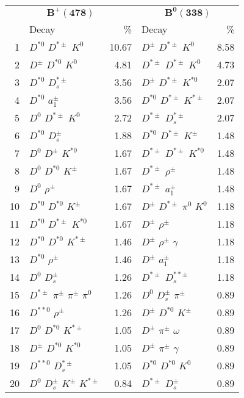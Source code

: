 \documentclass[6pt]{article}
\begin{document}
\begin{tabular}{rlr|lr}
\multicolumn{3}{c|}{$\boldsymbol{B^+(478)}$} & \multicolumn{2}{c}{$\boldsymbol{B^0(338)}$} \\
& Decay & \% & Decay & \% \\ \hline \hline
1 & $D^{*0}$ $D^{*\pm}$ $K^0$ & 10.67 & $D^{\pm}$ $D^{*\pm}$ $K^0$ & 8.58 \\
2 & $D^{\pm}$ $D^{*0}$ $K^0$ & 4.81 & $D^{*\pm}$ $D^{*\pm}$ $K^0$ & 4.73 \\
3 & $D^{*0}$ $D_s^{*\pm}$ & 3.56 & $D^{\pm}$ $D^{*\pm}$ $K^{*0}$ & 2.07 \\
4 & $D^{*0}$ $a_1^{\pm}$ & 3.56 & $D^{*0}$ $D^{*\pm}$ $K^{*\pm}$ & 2.07 \\
5 & $D^0$ $D^{*\pm}$ $K^0$ & 2.72 & $D^{*\pm}$ $D_s^{*\pm}$ & 2.07 \\
6 & $D^{*0}$ $D_s^{\pm}$ & 1.88 & $D^{*0}$ $D^{*\pm}$ $K^{\pm}$ & 1.48 \\
7 & $D^0$ $D^{\pm}$ $K^{*0}$ & 1.67 & $D^{*\pm}$ $D^{*\pm}$ $K^{*0}$ & 1.48 \\
8 & $D^0$ $D^{*0}$ $K^{\pm}$ & 1.67 & $D^{*\pm}$ $\rho^{\pm}$ & 1.48 \\
9 & $D^0$ $\rho^{\pm}$ & 1.67 & $D^{*\pm}$ $a_1^{\pm}$ & 1.48 \\
10 & $D^{*0}$ $D^{*0}$ $K^{\pm}$ & 1.67 & $D^{\pm}$ $D^{*\pm}$ $\pi^0$ $K^0$ & 1.18 \\
11 & $D^{*0}$ $D^{*\pm}$ $K^{*0}$ & 1.67 & $D^{\pm}$ $\rho^{\pm}$ & 1.18 \\
12 & $D^{*0}$ $D^{*0}$ $K^{*\pm}$ & 1.46 & $D^{\pm}$ $\rho^{\pm}$ $\gamma$ & 1.18 \\
13 & $D^{*0}$ $\rho^{\pm}$ & 1.46 & $D^{\pm}$ $a_1^{\pm}$ & 1.18 \\
14 & $D^0$ $D_s^{\pm}$ & 1.26 & $D^{*\pm}$ $D_s^{**\pm}$ & 1.18 \\
15 & $D^{*\pm}$ $\pi^{\pm}$ $\pi^{\pm}$ $\pi^0$ & 1.26 & $D^0$ $D_s^{\pm}$ $\pi^{\pm}$ & 0.89 \\
16 & $D^{**0}$ $\rho^{\pm}$ & 1.26 & $D^{\pm}$ $D^{*0}$ $K^{\pm}$ & 0.89 \\
17 & $D^0$ $D^{*0}$ $K^{*\pm}$ & 1.05 & $D^{\pm}$ $\pi^{\pm}$ $\omega$ & 0.89 \\
18 & $D^{\pm}$ $D^{*0}$ $K^{*0}$ & 1.05 & $D^{\pm}$ $\pi^{\pm}$ $\gamma$ & 0.89 \\
19 & $D^{**0}$ $D_s^{*\pm}$ & 1.05 & $D^{*0}$ $D^{*0}$ $K^0$ & 0.89 \\
20 & $D^0$ $D_s^{\pm}$ $K^{\pm}$ $K^{*\pm}$ & 0.84 & $D^{*\pm}$ $D_s^{\pm}$ & 0.89 \\

\end{tabular}
\end{document}
